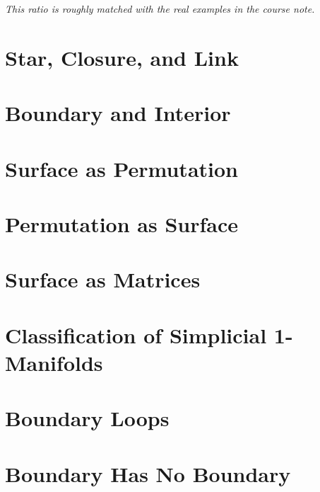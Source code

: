     \emph{This ratio is roughly matched with the real examples in the course note.}

\section{Star, Closure, and Link}

\section{Boundary and Interior}

\section{Surface as Permutation}

\section{Permutation as Surface}

\section{Surface as Matrices}

\section{Classiﬁcation of Simplicial 1-Manifolds}

\section{Boundary Loops}

\section{Boundary Has No Boundary}

